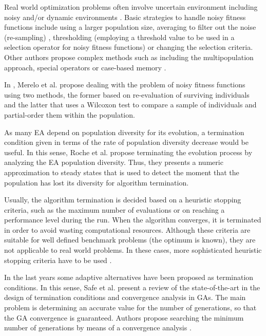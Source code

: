 \documentclass[runningheads,a4paper]{llncs}
\begin{document}
Real world optimization problems often involve uncertain environment including noisy and/or dynamic environments \cite{Jin2005303,QianYZ13}.
Basic strategies to handle noisy fitness functions include using a larger population size, averaging to filter out the noise (re-sampling) \cite{Branke98,Branke2001}, thresholding (employing a threshold value to be used in a selection operator for noisy fitness functions) \cite{Markon2001} or changing the selection criteria.
Other authors propose complex methods such as including the multipopulation approach, special operators or case-based memory \cite{BhattacharyaIM14}. 



In \cite{MereloECTA2014}, Merelo et al. propose dealing with the problem of noisy fitness functions using two methods, the former based on re-evaluation of surviving individuals and the latter that uses a Wilcoxon test to compare a sample of individuals and partial-order them within the population.


As many EA depend on population diversity for its evolution, a termination condition given in terms of the rate of population diversity decrease would be useful. 
In this sense, Roche et al. \cite{RocheTermination13} propose terminating the evolution process by analyzing the EA population diversity. Thus, they presents a numeric approximation to steady states that is used to detect the moment that the population has lost its diversity for algorithm termination.


Usually, the algorithm termination is decided based on a heuristic stopping criteria, such as the maximum number of evaluations or on reaching a performance level during the run. 
When the algorithm converges, it is terminated in order to avoid wasting computational resources.
Although these criteria are suitable for well defined benchmark problems (the optimum is known), they are not applicable to real world problems. 
In these cases, more sophisticated heuristic stopping criteria have to be used \cite{NME2909,Wagner2009,Wagner2010}.

In the last years some adaptive alternatives have been proposed  as termination conditions.
In this sense, Safe et al. \cite{Safe2004} present a review of the state-of-the-art in the design of termination conditions and convergence analysis in GAs.
The main problem is determining an accurate value for the number of generations, so that the GA convergence is guaranteed.
Authors propose searching the minimum number of generations by means of a convergence analysis \cite{Rudolph1994}.
\end{document}
